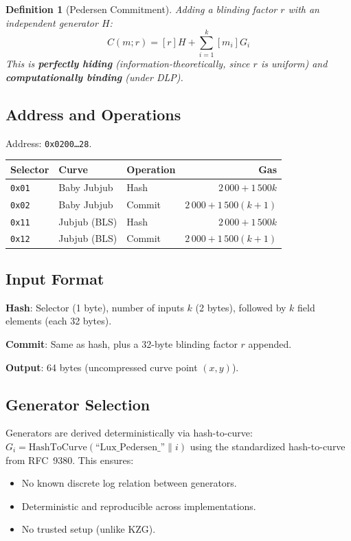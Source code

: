 \documentclass[11pt,a4paper]{article}
\newtheorem{definition}{Definition}
\begin{document}
\begin{definition}[Pedersen Commitment]
Adding a blinding factor $r$ with an independent generator $H$:
\[
  C(m; r) = [r] H + \sum_{i=1}^{k} [m_i] G_i
\]
This is \textbf{perfectly hiding} (information-theoretically, since $r$ is uniform)
and \textbf{computationally binding} (under DLP).
\end{definition}

\subsection{Address and Operations}

Address: \texttt{0x0200\ldots28}.

\begin{table}[H]
\centering
\begin{tabular}{lllr}
\toprule
\textbf{Selector} & \textbf{Curve} & \textbf{Operation} & \textbf{Gas} \\
\midrule
\texttt{0x01} & Baby Jubjub & Hash & $2\,000 + 1\,500k$ \\
\texttt{0x02} & Baby Jubjub & Commit & $2\,000 + 1\,500(k+1)$ \\
\texttt{0x11} & Jubjub (BLS) & Hash & $2\,000 + 1\,500k$ \\
\texttt{0x12} & Jubjub (BLS) & Commit & $2\,000 + 1\,500(k+1)$ \\
\bottomrule
\end{tabular}
\end{table}

\subsection{Input Format}

\textbf{Hash}: Selector (1 byte), number of inputs $k$ (2 bytes), followed by
$k$ field elements (each 32 bytes).

\textbf{Commit}: Same as hash, plus a 32-byte blinding factor $r$ appended.

\textbf{Output}: 64 bytes (uncompressed curve point $(x, y)$).

\subsection{Generator Selection}

Generators are derived deterministically via hash-to-curve: $G_i = \text{HashToCurve}(\text{``Lux\_Pedersen\_''} \| i)$
using the standardized hash-to-curve from RFC~9380. This ensures:
\begin{itemize}
  \item No known discrete log relation between generators.
  \item Deterministic and reproducible across implementations.
  \item No trusted setup (unlike KZG).
\end{itemize}
\end{document}
